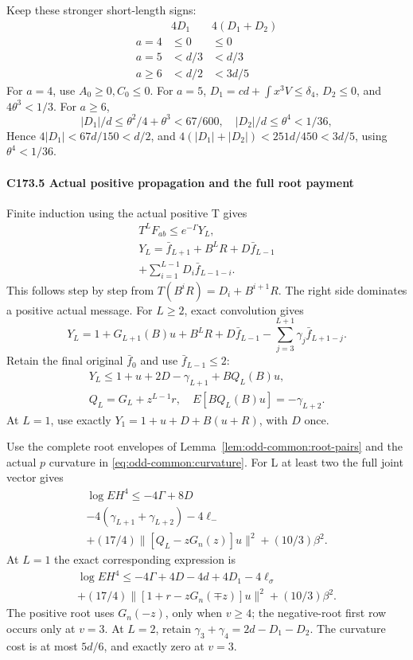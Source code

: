 Keep these stronger short-length signs:
\[
\begin{array}{c|cc}
 &4D_1&4(D_1+D_2)\\ \hline
a=4&\le0&\le0\\
a=5&<d/3&<d/3\\
a\ge6&<d/2&<3d/5
\end{array}                                        \tag{C173.T183.18}
\]
For \(a=4\), use \(A_0\ge0,\allowbreak \allowbreak  C_0\le0\). For \(a=5\), \(D_1=cd+\int x^3V\le \delta_4\), \(D_2\le0\), and \(4\theta^3<1/3\). For \(a\ge6\),
\[
|D_1|/d\le\theta^2/4+\theta^3<67/600,\quad
|D_2|/d\le\theta^4<1/36,
\]
Hence \(4|D_1|<67d/150<d/2\), and \(4(|D_1|+|D_2|)<251d/450<3d/5\), using \(\theta^4<1/36\).

\paragraph{C173.5 Actual positive propagation and the full root payment}

Finite induction using the actual positive T gives
\[
\begin{gathered}
T^LF_{ab}\le e^{-\Gamma}Y_L,\quad\\
Y_L=\bar f_{L+1}+B^LR+D\bar f_{L-1}\\
+\sum_{i=1}^{L-1}D_i \bar f_{L-1-i}.
\end{gathered}\tag{C173.T183.19}
\]
This follows step by step from \(T(B^iR)=D_i+B^{i+1}R\). The right side dominates a positive actual message. For \(L\ge2\), exact convolution gives
\[
Y_L=1+G_{L+1}(B)u+B^LR+D\bar f_{L-1}
 -\sum_{j=3}^{L+1}\gamma_j\bar f_{L+1-j}.
\]
Retain the final original \(\bar f_0\) and use \(\bar f_{L-1}\le2\):
\[
\begin{gathered}
Y_L\le1+u+2D-\gamma_{L+1}+BQ_L(B)u,\quad\\
Q_L=G_L+z^{L-1}r,\quad E[BQ_L(B)u]=-\gamma_{L+2}.
\end{gathered}\tag{C173.T183.20}
\]
At \(L=1\), use exactly \(Y_1=1+u+D+B(u+R)\), with \(D\) once.


Use the complete root envelopes of Lemma~\ref{lem:odd-common:root-pairs} and the actual $p$ curvature in \eqref{eq:odd-common:curvature}. For L at least two the full joint vector gives
\[
\begin{gathered}
\log EH^4\le-4\Gamma+8D\\
-4(\gamma_{L+1}+\gamma_{L+2})-4\ell_-\\
+(17/4)\|[Q_L-zG_n(z)]u\|^2+(10/3)\beta^2.
\end{gathered}\tag{C173.T183.24}
\]
At \(L=1\) the exact corresponding expression is
\[
\begin{gathered}
\log EH^4\le-4\Gamma+4D-4d+4D_1-4\ell_\sigma\\
+(17/4)\|[1+r-zG_n(\mp z)]u\|^2+(10/3)\beta^2.
\end{gathered}\tag{C173.T183.25}
\]
The positive root uses \(G_n(-z)\), only when \(v\ge4\); the negative-root first row occurs only at \(v=3\). At \(L=2\), retain \(\gamma_3+\gamma_4=2d-D_1-D_2\). The curvature cost is at most \(5d/6\), and exactly zero at \(v=3\).

